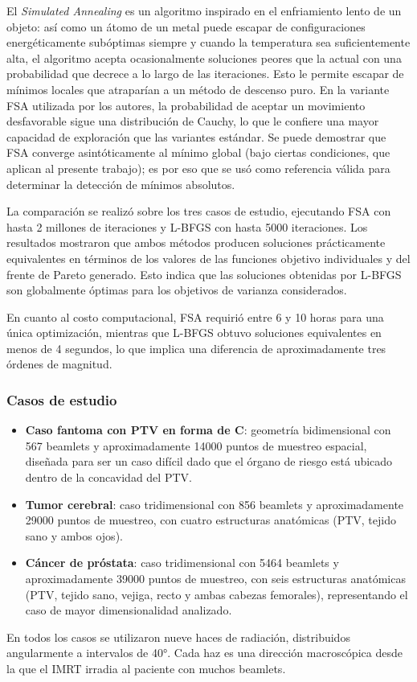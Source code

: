 El \textit{Simulated Annealing} es un algoritmo inspirado en el enfriamiento lento de un objeto: así como un átomo de un metal puede escapar de configuraciones energéticamente subóptimas siempre y cuando la temperatura sea suficientemente alta, el algoritmo acepta ocasionalmente soluciones peores que la actual con una probabilidad que decrece a lo largo de las iteraciones. Esto le permite escapar de mínimos locales que atraparían a un método de descenso puro. En la variante FSA utilizada por los autores, la probabilidad de aceptar un movimiento desfavorable sigue una distribución de Cauchy, lo que le confiere una mayor capacidad de exploración que las variantes estándar. Se puede demostrar que FSA converge asintóticamente al mínimo global (bajo ciertas condiciones, que aplican al presente trabajo); es por eso que se usó como referencia válida para determinar la detección de mínimos absolutos.

La comparación se realizó sobre los tres casos de estudio, ejecutando FSA con hasta 2 millones de iteraciones y L-BFGS con hasta 5000 iteraciones. Los resultados mostraron que ambos métodos producen soluciones prácticamente equivalentes en términos de los valores de las funciones objetivo individuales y del frente de Pareto generado. Esto indica que las soluciones obtenidas por L-BFGS son globalmente óptimas para los objetivos de varianza considerados.

En cuanto al costo computacional, FSA requirió entre 6 y 10 horas para una única optimización, mientras que L-BFGS obtuvo soluciones equivalentes en menos de 4 segundos, lo que implica una diferencia de aproximadamente tres órdenes de magnitud.

\subsubsection*{Casos de estudio}

\begin{itemize}
    \item \textbf{Caso fantoma con PTV en forma de C}: geometría bidimensional con 567 beamlets y aproximadamente 14000 puntos de muestreo espacial, diseñada para ser un caso difícil dado que el órgano de riesgo está ubicado dentro de la concavidad del PTV.
    \item \textbf{Tumor cerebral}: caso tridimensional con 856 beamlets y aproximadamente 29000 puntos de muestreo, con cuatro estructuras anatómicas (PTV, tejido sano y ambos ojos).
    \item \textbf{Cáncer de próstata}: caso tridimensional con 5464 beamlets y aproximadamente 39000 puntos de muestreo, con seis estructuras anatómicas (PTV, tejido sano, vejiga, recto y ambas cabezas femorales), representando el caso de mayor dimensionalidad analizado.
\end{itemize}

En todos los casos se utilizaron nueve haces de radiación, distribuidos angularmente a intervalos de 40°. Cada haz es una dirección macroscópica desde la que el IMRT irradia al paciente con muchos beamlets.
